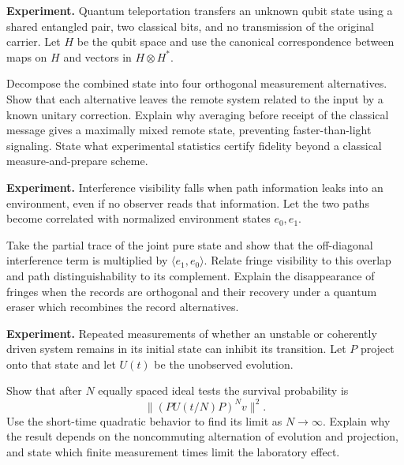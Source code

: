 \begin{exercise}
\textbf{Experiment.}
Quantum teleportation transfers an unknown qubit state using a shared
entangled pair, two classical bits, and no transmission of the original
carrier.  Let \(H\) be the qubit space and use the canonical correspondence
between maps on \(H\) and vectors in \(H\otimes H^*\).

Decompose the combined state into four orthogonal measurement alternatives.
Show that each alternative leaves the remote system related to the input by a
known unitary correction.  Explain why averaging before receipt of the
classical message gives a maximally mixed remote state, preventing
faster-than-light signaling.  State what experimental statistics certify
fidelity beyond a classical measure-and-prepare scheme.
\end{exercise}

\begin{exercise}
\textbf{Experiment.}
Interference visibility falls when path information leaks into an
environment, even if no observer reads that information.  Let the two paths
become correlated with normalized environment states \(e_0,e_1\).

Take the partial trace of the joint pure state and show that the
off-diagonal interference term is multiplied by
\(\langle e_1,e_0\rangle\).  Relate fringe visibility to this overlap and path
distinguishability to its complement.  Explain the disappearance of fringes
when the records are orthogonal and their recovery under a quantum eraser
which recombines the record alternatives.
\end{exercise}

\begin{exercise}
\textbf{Experiment.}
Repeated measurements of whether an unstable or coherently driven system
remains in its initial state can inhibit its transition.  Let \(P\) project
onto that state and let \(U(t)\) be the unobserved evolution.

Show that after \(N\) equally spaced ideal tests the survival probability is
\[
        \bigl\|(PU(t/N)P)^Nv\bigr\|^2.
\]
Use the short-time quadratic behavior to find its limit as \(N\to\infty\).
Explain why the result depends on the noncommuting alternation of evolution
and projection, and state which finite measurement times limit the laboratory
effect.
\end{exercise}
